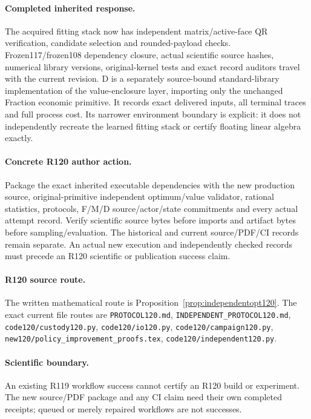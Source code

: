 \paragraph{Completed inherited response.}
The acquired fitting stack now has independent matrix/active-face QR verification, candidate selection and rounded-payload checks. Frozen117/frozen108 dependency closure, actual scientific source hashes, numerical library versions, original-kernel tests and exact record auditors travel with the current revision. D is a separately source-bound standard-library implementation of the value-enclosure layer, importing only the unchanged Fraction economic primitive. It records exact delivered inputs, all terminal traces and full process cost. Its narrower environment boundary is explicit: it does not independently recreate the learned fitting stack or certify floating linear algebra exactly.
\paragraph{Concrete R120 author action.}
Package the exact inherited executable dependencies with the new production source, original-primitive independent optimum/value validator, rational statistics, protocols, F/M/D source/actor/state commitments and every actual attempt record. Verify scientific source bytes before imports and artifact bytes before sampling/evaluation. The historical and current source/PDF/CI records remain separate. An actual new execution and independently checked records must precede an R120 scientific or publication success claim.
\paragraph{R120 source route.}
The written mathematical route is Proposition~\ref{prop:independentopt120}. The exact current file routes are \nolinkurl{PROTOCOL120.md}, \nolinkurl{INDEPENDENT_PROTOCOL120.md}, \nolinkurl{code120/custody120.py}, \nolinkurl{code120/io120.py}, \nolinkurl{code120/campaign120.py}, \nolinkurl{new120/policy_improvement_proofs.tex}, \nolinkurl{code120/independent120.py}.
\paragraph{Scientific boundary.}
An existing R119 workflow success cannot certify an R120 build or experiment. The new source/PDF package and any CI claim need their own completed receipts; queued or merely repaired workflows are not successes.

